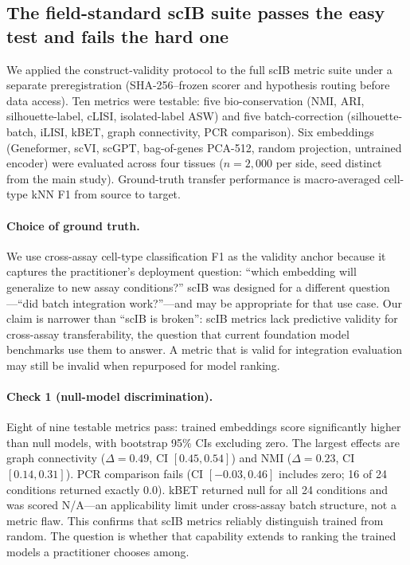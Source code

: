 \documentclass[10pt,letterpaper]{article}
\begin{document}
\subsection{The field-standard scIB suite passes the easy test and fails the hard one}
\label{sec:scib}

We applied the construct-validity protocol to the full scIB metric suite \citep{luecken2022scib} under a separate preregistration (SHA-256--frozen scorer and hypothesis routing before data access). Ten metrics were testable: five bio-conservation (NMI, ARI, silhouette-label, cLISI, isolated-label ASW) and five batch-correction (silhouette-batch, iLISI, kBET, graph connectivity, PCR comparison). Six embeddings (Geneformer, scVI, scGPT, bag-of-genes PCA-512, random projection, untrained encoder) were evaluated across four tissues ($n = 2{,}000$ per side, seed distinct from the main study). Ground-truth transfer performance is macro-averaged cell-type kNN F1 from source to target.

\paragraph{Choice of ground truth.} We use cross-assay cell-type classification F1 as the validity anchor because it captures the practitioner's deployment question: ``which embedding will generalize to new assay conditions?'' scIB was designed for a different question---``did batch integration work?''---and may be appropriate for that use case. Our claim is narrower than ``scIB is broken'': scIB metrics lack predictive validity for cross-assay transferability, the question that current foundation model benchmarks use them to answer. A metric that is valid for integration evaluation may still be invalid when repurposed for model ranking.

\paragraph{Check 1 (null-model discrimination).} Eight of nine testable metrics pass: trained embeddings score significantly higher than null models, with bootstrap 95\% CIs excluding zero. The largest effects are graph connectivity ($\Delta = 0.49$, CI $[0.45, 0.54]$) and NMI ($\Delta = 0.23$, CI $[0.14, 0.31]$). PCR comparison fails (CI $[-0.03, 0.46]$ includes zero; 16 of 24 conditions returned exactly 0.0). kBET returned null for all 24 conditions and was scored N/A---an applicability limit under cross-assay batch structure, not a metric flaw. This confirms that scIB metrics reliably distinguish trained from random. The question is whether that capability extends to ranking the trained models a practitioner chooses among.
\end{document}
